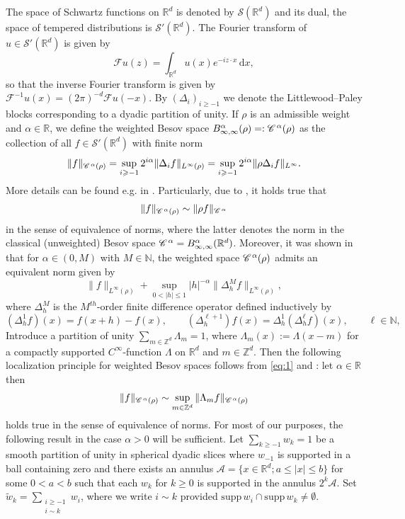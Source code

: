 \documentclass[a4paper,11pt]{article}
\renewcommand{\leq}{\leqslant}
\renewcommand{\geq}{\geqslant}
\newcommand{\backassign}{=:}
\numberwithin{equation}{section}
\newcommand{\CC}{\mathscr{C} \hspace{.1em}}
\newcommand{\R}{\mathbb{R}}
\newcommand{\N}{\mathbb{N}}
\newcommand{\8}{\infty}
\newcommand{\dd}{\mathrm{d}}
\begin{document}
The space of Schwartz functions on $\R^{d}$ is denoted by $\mathcal{S}(\R^{d})$ and its dual, the space of tempered distributions is $\mathcal{S}'(\R^{d})$. The Fourier transform of $u\in \mathcal{S}'(\R^{d})$ is given by
$$
\mathcal{F}u(z)=\int_{\R^{d}}u(x)e^{-i z\cdot x}\,\dd x,
$$
so that the inverse Fourier transform is given by $\mathcal{F}^{-1}u(x)=(2\pi)^{-d}\mathcal{F}u(-x).$
 By $(\Delta_{i})_{i\geq -1}$ we denote the Littlewood--Paley blocks corresponding to a dyadic partition of unity.
If $\rho$ is an admissible weight and $\alpha\in\mathbb{R}$, we define the weighted Besov space $B^\alpha_{\infty,\infty}(\rho)\backassign \CC^\alpha(\rho)$ as the collection of all $f\in\mathcal{S}'(\R^{d})$ with finite norm
\[ \| f \|_{\CC^{\alpha} (\rho)} = \sup_{i\geq -1} 2^{i \alpha} \| \Delta_i f
   \|_{L^{\infty} (\rho)} = \sup_{i\geq -1} 2^{i \alpha} \| \rho \Delta_i f
   \|_{L^{\infty}} . \]
More details can be found  e.g. in \cite{T06}. 
Particularly,  due to \cite[Theorem 6.5]{T06}, it holds true that
\begin{equation}\label{eq:1}
   \|f\|_{\CC^\alpha(\rho)}\sim\|\rho f\|_{\CC^\alpha}
\end{equation}
   in the sense of equivalence of norms, where the latter denotes the norm in the classical (unweighted) Besov space $\CC^\alpha=B^\alpha_{\infty,\infty}(\R^{d})$. Moreover, it was shown in \cite[Theorem 6.9]{T06} that for $\alpha\in(0,M)$ with $M\in\N$, the weighted space $\CC^\alpha(\rho)$ admits an equivalent norm given by
\begin{equation}\label{eq:2h}
\|f\|_{L^\infty(\rho)}+\sup_{0<|h|\leqslant 1}|h|^{-\alpha}\|\Delta^M_h f\|_{L^\infty(\rho)},
\end{equation}
where $\Delta^M_h$ is the $M^{th}$-order finite difference operator  defined inductively by
$$
(\Delta^1_hf)(x)=f(x+h)-f(x),\qquad (\Delta^{\ell+1}_h)f(x)=\Delta^1_h(\Delta^{\ell}_hf)(x),\qquad\ell\in\N,
$$
Introduce a partition of unity  $\sum_{m\in\mathbb{Z}^{d}} \Lambda_m = 1$, where $\Lambda_{m}(x):=\Lambda(x-m)$ for a compactly supported $C^{\8}$-function $\Lambda$ on $\R^{d}$ and $m\in\mathbb{Z}^{d}$. Then the following localization principle for weighted Besov spaces follows from \eqref{eq:1} and \cite[Theorem 2.4.7]{T92}: let $\alpha\in\R$ then
\begin{equation}\label{eq:lem2.1}
   \|f\|_{\CC^\alpha(\rho)}\sim\sup_{m\in\mathbb{Z}^{d}}\|\Lambda_{m} f\|_{\CC^\alpha(\rho)}
\end{equation}
holds true in the sense of equivalence of norms. For most of our purposes, the following result in the case $\alpha>0$ will be sufficient. Let  $\sum_{k\geq-1} w_k = 1$ be a smooth partition of unity in spherical dyadic slices
where $w_{-1}$ is supported in a ball containing zero and there exists an annulus $\mathcal{A}=\{x\in\R^{d};a\leq|x|\leq b\}$ for some $0<a<b$ such that each $w_k$ for $k\geq0$ is supported in the annulus $2^k\mathcal{A}$. Set
$\tilde{w}_k = \sum_{\substack{i\geq-1\\i \sim k}} w_i$, where we write $i\sim k$ provided $\mathrm{supp}\,  w_{i}\cap \mathrm{supp}\, w_{k}\neq \emptyset.$
\end{document}
